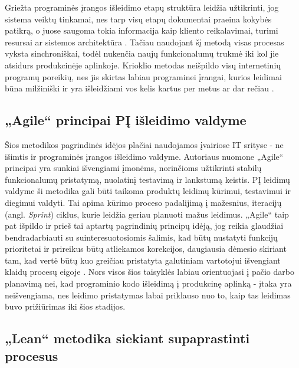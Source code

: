 \documentclass{VUMIFPSkursinis}
\begin{document}
Griežta programinės įrangos išleidimo etapų struktūra leidžia užtikrinti, jog sistema veiktų tinkamai, nes tarp visų etapų dokumentai praeina kokybės patikrą, o juose saugoma tokia informacija kaip kliento reikalavimai, turimi resursai ar sistemos architektūra \cite{SaltKetvirtas}. Tačiau naudojant šį metodą visas procesas vyksta sinchroniškai, todėl nukenčia naujų funkcionalumų trukmė iki kol jie atsidurs produkcinėje aplinkoje. Krioklio metodas neišpildo visų internetinių programų poreikių, nes jis skirtas labiau programinei įrangai, kurios leidimai būna milžiniški ir yra išleidžiami vos kelis kartus per metus ar dar rečiau \cite{SaltTrecias}.

\subsection{„Agile“ principai PĮ išleidimo valdyme}

Šios metodikos pagrindinės idėjos plačiai naudojamos įvairiose IT srityse - ne išimtis ir programinės įrangos išleidimo valdyme. Autoriaus nuomone „Agile“ principai yra sunkiai išvengiami įmonėms, norinčioms užtikrinti stabilų funkcionalumų pristatymą, nuolatinį testavimą ir lankstumą keistis. PĮ leidimų valdyme ši metodika gali būti taikoma produktų leidimų kūrimui, testavimui ir diegimui valdyti. Tai apima kūrimo proceso padalijimą į mažesnius, iteracijų (angl. \textit{Sprint}) ciklus, kurie leidžia geriau planuoti mažus leidimus. „Agile“ taip pat išpildo ir prieš tai aptartų pagrindinių principų idėją, jog reikia glaudžiai bendradarbiauti su suinteresuotosiomis šalimis, kad būtų nustatyti funkcijų prioritetai ir prireikus būtų atliekamos korekcijos, daugiausia dėmesio skiriant tam, kad vertė būtų kuo greičiau pristatyta galutiniam vartotojui išvengiant klaidų procesų eigoje \cite{SaltTrecias}. Nors visos šios taisyklės labiau orientuojasi į pačio darbo planavimą nei, kad programinio kodo išleidimą į produkcinę aplinką - įtaka yra neišvengiama, nes leidimo pristatymas labai priklauso nuo to, kaip tas leidimas buvo prižiūrimas iki šios stadijos.

\subsection{„Lean“ metodika siekiant supaprastinti procesus}
\end{document}
